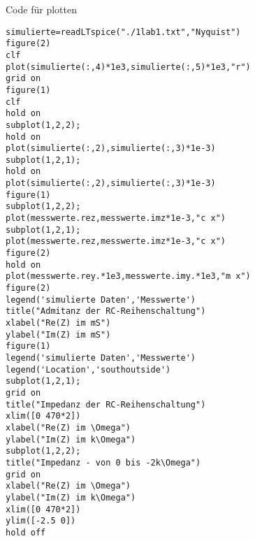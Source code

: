 Code für plotten
\begin{verbatim}
simulierte=readLTspice("./1lab1.txt","Nyquist")
figure(2)
clf
plot(simulierte(:,4)*1e3,simulierte(:,5)*1e3,"r")
grid on
figure(1)
clf
hold on
subplot(1,2,2);
hold on
plot(simulierte(:,2),simulierte(:,3)*1e-3)
subplot(1,2,1);
hold on
plot(simulierte(:,2),simulierte(:,3)*1e-3)
figure(1)
subplot(1,2,2);
plot(messwerte.rez,messwerte.imz*1e-3,"c x")
subplot(1,2,1);
plot(messwerte.rez,messwerte.imz*1e-3,"c x")
figure(2)
hold on
plot(messwerte.rey.*1e3,messwerte.imy.*1e3,"m x")
figure(2)
legend('simulierte Daten','Messwerte')
title("Admitanz der RC-Reihenschaltung")
xlabel("Re(Z) im mS")
ylabel("Im(Z) im mS")
figure(1)
legend('simulierte Daten','Messwerte')
legend('Location','southoutside')
subplot(1,2,1);
grid on
title("Impedanz der RC-Reihenschaltung")
xlim([0 470*2])
xlabel("Re(Z) im \Omega")
ylabel("Im(Z) im k\Omega")
subplot(1,2,2);
title("Impedanz - von 0 bis -2k\Omega")
grid on
xlabel("Re(Z) im \Omega")
ylabel("Im(Z) im k\Omega")
xlim([0 470*2])
ylim([-2.5 0])
hold off
\end{verbatim}
%
%
%
%
\begin{flushright}
  \textit{\autorA}
\end{flushright}
%
%
%
%
%
%
%
%
%
%
%